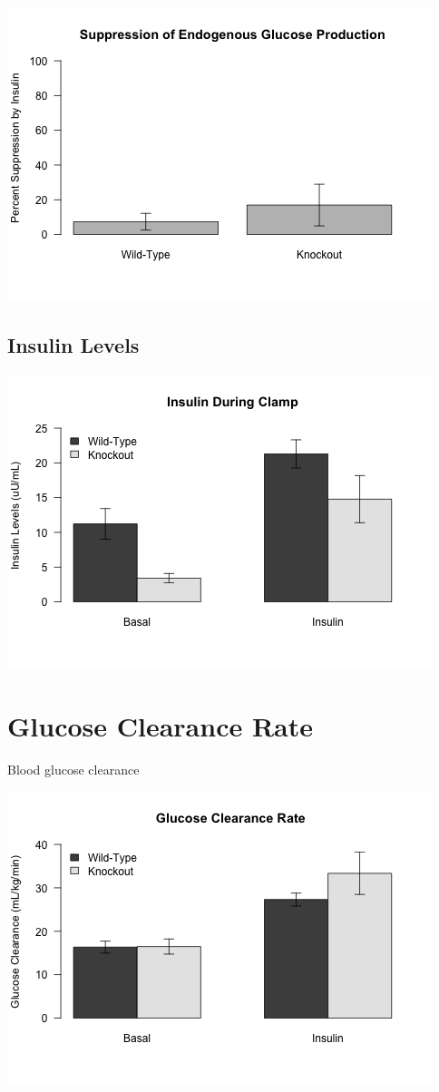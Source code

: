 \documentclass[]{article}
\begin{document}
\includegraphics{figures/sHGP-1.png}

\subsection{Insulin Levels}\label{insulin-levels}

\includegraphics{figures/insulin-1.png}

\section{Glucose Clearance Rate}\label{glucose-clearance-rate}

Blood glucose clearance

\includegraphics{figures/glucose-clearance-1.png}
\end{document}
